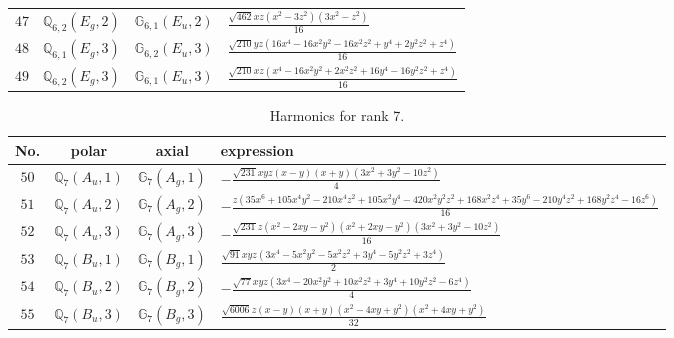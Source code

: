 \documentclass[fleqn,8pt,landscape]{jsarticle}
\begin{document}
\begin{table}[ht!]
\begin{center}
\begin{tabular}{cccl}
$ 47 $ & $ \mathbb{Q}_{6,2}(E_{g},2) $ & $ \mathbb{G}_{6,1}(E_{u},2) $ & $ \frac{\sqrt{462} x z \left(x^{2} - 3 z^{2}\right) \left(3 x^{2} - z^{2}\right)}{16} $ \\
$ 48 $ & $ \mathbb{Q}_{6,1}(E_{g},3) $ & $ \mathbb{G}_{6,2}(E_{u},3) $ & $ \frac{\sqrt{210} y z \left(16 x^{4} - 16 x^{2} y^{2} - 16 x^{2} z^{2} + y^{4} + 2 y^{2} z^{2} + z^{4}\right)}{16} $ \\
$ 49 $ & $ \mathbb{Q}_{6,2}(E_{g},3) $ & $ \mathbb{G}_{6,1}(E_{u},3) $ & $ \frac{\sqrt{210} x z \left(x^{4} - 16 x^{2} y^{2} + 2 x^{2} z^{2} + 16 y^{4} - 16 y^{2} z^{2} + z^{4}\right)}{16} $ \\
 \hline \hline
\end{tabular}
\end{center}
\end{table}
\begin{table}[ht!]
\begin{center}
\caption{Harmonics for rank 7.}
\renewcommand{\arraystretch}{1.3}
\begin{tabular}{cccl} \hline \hline
No. & polar & axial & expression \\ \hline
$ 50 $ & $ \mathbb{Q}_{7}(A_{u},1) $ & $ \mathbb{G}_{7}(A_{g},1) $ & $ - \frac{\sqrt{231} x y z \left(x - y\right) \left(x + y\right) \left(3 x^{2} + 3 y^{2} - 10 z^{2}\right)}{4} $ \\
$ 51 $ & $ \mathbb{Q}_{7}(A_{u},2) $ & $ \mathbb{G}_{7}(A_{g},2) $ & $ - \frac{z \left(35 x^{6} + 105 x^{4} y^{2} - 210 x^{4} z^{2} + 105 x^{2} y^{4} - 420 x^{2} y^{2} z^{2} + 168 x^{2} z^{4} + 35 y^{6} - 210 y^{4} z^{2} + 168 y^{2} z^{4} - 16 z^{6}\right)}{16} $ \\
$ 52 $ & $ \mathbb{Q}_{7}(A_{u},3) $ & $ \mathbb{G}_{7}(A_{g},3) $ & $ - \frac{\sqrt{231} z \left(x^{2} - 2 x y - y^{2}\right) \left(x^{2} + 2 x y - y^{2}\right) \left(3 x^{2} + 3 y^{2} - 10 z^{2}\right)}{16} $ \\
$ 53 $ & $ \mathbb{Q}_{7}(B_{u},1) $ & $ \mathbb{G}_{7}(B_{g},1) $ & $ \frac{\sqrt{91} x y z \left(3 x^{4} - 5 x^{2} y^{2} - 5 x^{2} z^{2} + 3 y^{4} - 5 y^{2} z^{2} + 3 z^{4}\right)}{2} $ \\
$ 54 $ & $ \mathbb{Q}_{7}(B_{u},2) $ & $ \mathbb{G}_{7}(B_{g},2) $ & $ - \frac{\sqrt{77} x y z \left(3 x^{4} - 20 x^{2} y^{2} + 10 x^{2} z^{2} + 3 y^{4} + 10 y^{2} z^{2} - 6 z^{4}\right)}{4} $ \\
$ 55 $ & $ \mathbb{Q}_{7}(B_{u},3) $ & $ \mathbb{G}_{7}(B_{g},3) $ & $ \frac{\sqrt{6006} z \left(x - y\right) \left(x + y\right) \left(x^{2} - 4 x y + y^{2}\right) \left(x^{2} + 4 x y + y^{2}\right)}{32} $ \\

\end{tabular}
\end{center}
\end{table}
\end{document}
